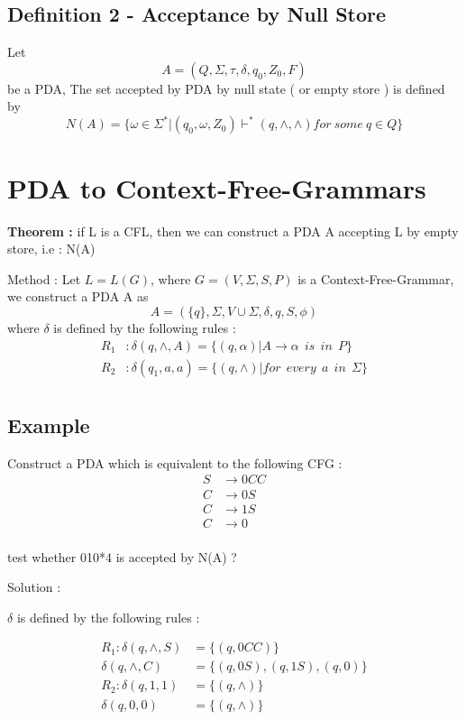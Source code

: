 \documentclass[12pt]{book}
\begin{document}
\subsection{Definition 2 - Acceptance by Null Store}

Let 
$$
A = (Q,\Sigma,\tau,\delta,q_{0},Z_{0},F)
$$
be a PDA, The set accepted by PDA by null state ( or empty store ) is defined by 
$$
N(A) = \{ \omega \in \Sigma^{*} | (q_{0},\omega,Z_{0}) \vdash^{*} (q, \wedge, \wedge ) for \: some \: q \in Q \}
$$


\section{PDA to Context-Free-Grammars}

\textbf{Theorem :} if L is a CFL, then we can construct a PDA A accepting L by empty store, i.e : N(A)

Method : Let $L = L(G)$, where $G=(V, \Sigma, S, P)$ is a Context-Free-Grammar, we construct a PDA A as
$$
A = (\{ q \},\Sigma, V \cup \Sigma ,\delta,q,S,\phi)
$$
where $\delta$ is defined by the following rules :
\begin{align*}
R_{1} &: \delta(q,\wedge,A) = \{ (q,\alpha) | A \to \alpha \:\: is \:\: in \:\: P \} \\
R_{2} &: \delta(q_{1},a,a) = \{ (q,\wedge) | for \:\: every \:\: a \:\: in \:\: \Sigma \} \\
\end{align*}


\subsection{Example}

Construct a PDA which is equivalent to the following CFG :
\begin{align*}
S &\to 0CC \\
C &\to 0S \\
C &\to 1S \\
C &\to 0 \\
\end{align*}

test whether 010*{4} is accepted by N(A) ?

Solution :

$\delta$ is defined by the following rules :

\begin{align*}
R_{1} :  \delta(q,\wedge,S) &= \{ (q,0CC) \} \\
  \delta(q,\wedge,C) &= \{ (q,0S), (q,1S), (q,0) \} \\
R_{2} : \delta(q,1,1) &= \{ (q,\wedge) \} \\
 \delta(q,0,0) &= \{ (q,\wedge) \} \\
\end{align*}
\end{document}

